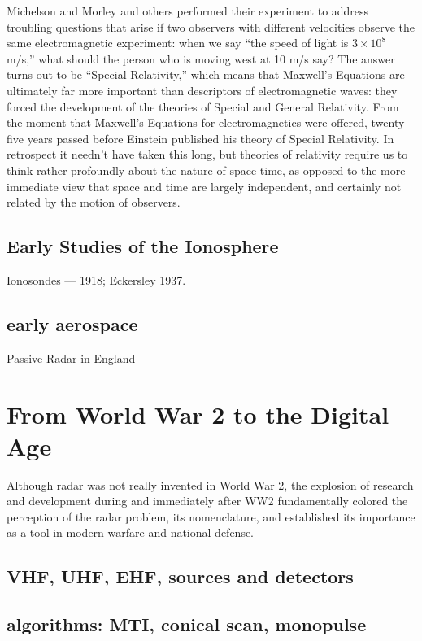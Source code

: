 Michelson and Morley and others performed their experiment to address
troubling questions that arise if two observers with different
velocities observe the same electromagnetic experiment: when we say
``the speed of light is $3\times10^8$ m/s,'' what should the person
who is moving west at 10 m/s say?  The answer turns out to be
``Special Relativity,'' which means that Maxwell's Equations are
ultimately far more important than descriptors of electromagnetic
waves: they forced the development of the theories of Special and
General Relativity.  From the moment that Maxwell's Equations for
electromagnetics were offered, twenty five years passed before
Einstein published his theory of Special Relativity.  In retrospect it
needn't have taken this long, but theories of relativity require us to
think rather profoundly about the nature of space-time, as opposed to
the more immediate view that space and time are largely independent,
and certainly not related by the motion of observers.

\subsection{Early Studies of the Ionosphere}

Ionosondes --- 1918; Eckersley 1937.

\subsection{early aerospace}

Passive Radar in England

\section{From World War 2 to the Digital Age}

Although radar was not really invented in World War 2, the explosion
of research and development during and immediately after WW2
fundamentally colored the perception of the radar problem, its
nomenclature, and established its importance as a tool in modern
warfare and national defense.

\subsection{VHF, UHF, EHF, sources and detectors}

\subsection{algorithms: MTI, conical scan, monopulse}

